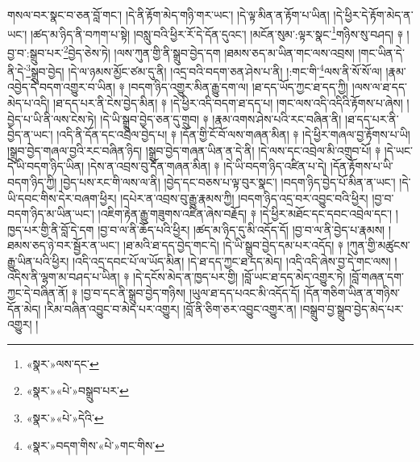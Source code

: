 གསལ་བར་སྣང་བ་ཅན་བློ་གང་། །དེ་ནི་རྟོག་མེད་གཉི་གར་ཡང་། །དེ་ལྟ་མིན་ན་རྟོག་པ་ཡིན། །དེ་ཕྱིར་དེ་རྟོག་མེད་ན་ཡང་། །ཚད་མ་ཉིད་ནི་བཀག་པ་སྟེ། །བསླུ་བའི་ཕྱིར་རོ་དེ་དོན་དུའང་། །མངོན་སུམ་:ལྟར་སྣང་\footnote{«སྣར་»ལས་དང་}གཉིས་སུ་བཤད། ༈ །བྱ་བ་:སྒྲུབ་པར་\footnote{«སྣར་»«པེ་»བསྒྲུབ་པར་}བྱེད་ཅེས་ཏེ། །ལས་ཀུན་གྱི་ནི་སྒྲུབ་བྱེད་དག །ཐམས་ཅད་མ་ཡིན་གང་ལས་འབྲས། །གང་ཡིན་དེ་ནི་དེ་\footnote{«སྣར་»«པེ་»དེའི་}སྒྲུབ་བྱེད། །དེ་ལ་ཉམས་མྱོང་ཙམ་དུ་ནི། །འདྲ་བའི་བདག་ཅན་ཤེས་པ་ནི། །:གང་གི་\footnote{«སྣར་»བདག་གིས་«པེ་»གང་གིས་}ལས་ནི་སོ་སོ་ལ། །རྣམ་འབྱེད་དེ་བདག་འགྱུར་བ་ཡིན། ༈ །བདག་ཉིད་འགྱུར་མིན་རྒྱུ་དག་ལ། །ཐ་དད་ཡོད་ཀྱང་ཐ་དད་ཀྱི། །ལས་ལ་ཐ་དད་མེད་པ་འདི། །ཐ་དད་པར་ནི་ངེས་བྱེད་མིན། ༈ །དེ་ཕྱིར་འདི་བདག་ཐ་དད་པ། །གང་ལས་འདི་འདིའི་རྟོགས་པ་ཞེས། །བྱེད་པ་ཡི་ནི་ལས་ངེས་ཏེ། །དེ་ཡི་སྒྲུབ་བྱེད་ཅན་དུ་གྲུབ། ༈ །རྣམ་འགས་ཤེས་པའི་རང་བཞིན་ནི། །ཐ་དད་པར་ནི་བྱེད་ན་ཡང་། །འདི་ནི་དོན་དང་འབྲེལ་བྱེད་པ། ༈ །དོན་གྱི་ངོ་བོ་ལས་གཞན་མིན། ༈ །དེ་ཕྱིར་གཞལ་བྱ་རྟོགས་པ་ཡི། །སྒྲུབ་བྱེད་གཞལ་བྱའི་རང་བཞིན་ཉིད། །སྒྲུབ་བྱེད་གཞན་ཡིན་ན་དེ་ནི། །དེ་ལས་དང་འབྲེལ་མི་འགྲུབ་པོ། ༈ །དེ་ཡང་དེ་ཡི་བདག་ཉིད་ཡིན། །དེས་ན་འབྲས་བུ་དོན་གཞན་མིན། ༈ །དེ་ཡི་བདག་ཉིད་འཛིན་པ་དེ། །དོན་རྟོགས་པ་ཡི་བདག་ཉིད་ཀྱི། །བྱེད་པས་རང་གི་ལས་ལ་ནི། །བྱེད་དང་བཅས་པ་ལྟ་བུར་སྣང་། །བདག་ཉིད་བྱེད་པོ་མིན་ན་ཡང་། །དེ་ཡི་དབང་གིས་དེར་བཞག་ཕྱིར། །དཔེར་ན་འབྲས་བུ་རྒྱུ་རྣམས་ཀྱི། །བདག་ཉིད་འདྲ་བར་འབྱུང་བའི་ཕྱིར། །བྱ་བ་བདག་ཉིད་མ་ཡིན་ཡང་། །འཇིག་རྟེན་རྒྱུ་གཟུགས་འཛིན་ཞེས་བརྗོད། ༈ །དེ་ཕྱིར་མཐོང་དང་དབང་འབྲེལ་དང་། །ཁྱད་པར་གྱི་ནི་བློ་དེ་དག །བྱ་བ་ལ་ནི་ཆོད་པའི་ཕྱིར། །ཚད་མ་ཉིད་དུ་མི་འདོད་དོ། །བྱ་བ་ལ་ནི་བྱེད་པ་རྣམས། །ཐམས་ཅད་ཉེ་བར་སྦྱོར་ན་ཡང་། །ཐ་མའི་ཐ་དད་བྱེད་གང་དེ། །དེ་ཡི་སྒྲུབ་བྱེད་དམ་པར་འདོད། ༈ །ཀུན་གྱི་མཚུངས་རྒྱུ་ཡིན་པའི་ཕྱིར། །འདི་འདྲ་དབང་པོ་ལ་ཡོད་མིན། །དེ་ཐ་དད་ཀྱང་ཐ་དད་མེད། །འདི་འདི་ཞེས་བྱ་དེ་གང་ལས། །འདིས་ནི་ལྷག་མ་བཤད་པ་ཡིན། ༈ །དེ་དངོས་མེད་ན་ཁྱད་པར་གྱི། །བློ་ཡང་ཐ་དད་མེད་འགྱུར་ཏེ། །བློ་གཞན་དག་ཀྱང་དེ་བཞིན་ནོ། ༈ །བྱ་བ་དང་ནི་སྒྲུབ་བྱེད་གཉིས། །ཡུལ་ཐ་དད་པའང་མི་འདོད་དོ། །དོན་གཅིག་ཡིན་ན་གཉིས་དོན་མེད། །རིམ་བཞིན་འབྱུང་བ་མེད་པར་འགྱུར། །བློ་ནི་ཅིག་ཅར་འབྱུང་འགྱུར་ན། །བསྒྲུབ་བྱ་སྒྲུབ་བྱེད་མེད་པར་འགྱུར། །
